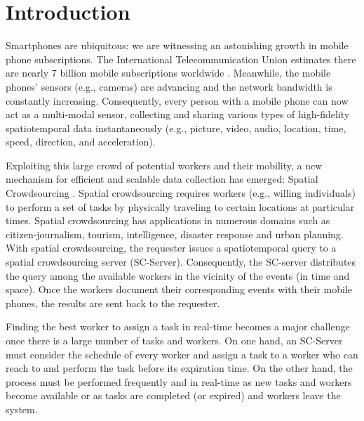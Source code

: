 \section{Introduction}

Smartphones are ubiquitous: we are witnessing an astonishing growth in mobile phone subscriptions. The International Telecommunication Union estimates there are nearly 7 billion mobile subscriptions worldwide \cite{Mobiforge14}. Meanwhile, the mobile phones' sensors (e.g., cameras) are advancing and the network bandwidth is constantly increasing. Consequently, every person with a mobile phone can now act as a multi-modal sensor, collecting and sharing various types of high-fidelity spatiotemporal data instantaneously (e.g., picture, video, audio, location, time, speed, direction, and acceleration).

Exploiting this large crowd of potential workers and their mobility, a new mechanism for efficient and scalable data collection has emerged: Spatial Crowdsourcing \cite{Kazemi12}. Spatial crowdsourcing requires workers (e.g., willing individuals) to perform a set of tasks by physically traveling to certain locations at particular times. Spatial crowdsourcing has applications in numerous domains such as citizen-journalism, tourism, intelligence, disaster response and urban planning. With spatial crowdsourcing, the requester issues a spatiotemporal query to a spatial crowdsourcing server (SC-Server). Consequently, the SC-server distributes the query among the available workers in the vicinity of the events (in time and space). Once the workers document their corresponding events with their mobile phones, the results are sent back to the requester.

Finding the best worker to assign a task in real-time becomes a major challenge once there is a large number of tasks and workers. On one hand, an SC-Server must consider the schedule of every worker and assign a task to a worker who can reach to and perform the task before its expiration time. On the other hand, the process must be performed frequently and in real-time as new tasks and workers become available or as tasks are completed (or expired) and workers leave the system.

